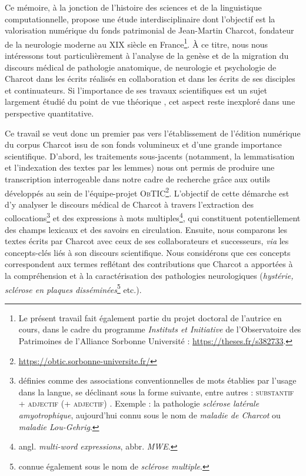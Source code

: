 \label{intro}
Ce mémoire, à la jonction de l'histoire des sciences et de la linguistique computationnelle, propose une étude interdisciplinaire dont l'objectif est la valorisation numérique du fonds patrimonial de Jean-Martin Charcot, fondateur de la neurologie moderne au XIX\ieme{} siècle en France\footnote{Le présent travail fait également partie du projet doctoral de l'autrice en cours, dans le cadre du programme \textit{Instituts et Initiative} de l'Observatoire des Patrimoines de l'Alliance Sorbonne Université : \url{https://theses.fr/s382733}.}. À ce titre, nous nous intéressons tout particulièrement à l'analyse de la genèse et de la migration du discours médical de pathologie anatomique, de neurologie et psychologie de Charcot dans les écrits réalisés en collaboration et dans les écrits de ses disciples et continuateurs. Si l'importance de ses travaux scientifiques est un sujet largement étudié du point de vue théorique \citep{bogousslavsky2011following,broussolle2012,camargo2024}, 
cet aspect reste inexploré dans une perspective quantitative.

Ce travail se veut donc un premier pas vers l'établissement de l'édition numérique du corpus Charcot issu de son fonds volumineux et d'une grande importance scientifique. D'abord, les traitements sous-jacents (notamment, la lemmatisation et l'indexation des textes par les lemmes) nous ont permis de produire une transcription interrogeable dans notre cadre de recherche grâce aux outils développés au sein de l'équipe-projet \textsc{ObTIC}\footnote{\url{https://obtic.sorbonne-universite.fr/}}. L'objectif de cette démarche est d'y analyser le discours médical de Charcot à travers l'extraction des collocations\footnote{définies comme des \og{}associations conventionnelles de mots établies par l'usage dans la langue\fg{}, se déclinant sous la forme suivante, entre autres : \textsc{substantif + adjectif (+ adjectif)} \citep[p. 100]{nerima2006}. Exemple : la pathologie \textit{sclérose latérale amyotrophique}, aujourd'hui connu sous le nom de \textit{maladie de Charcot} ou \textit{maladie Lou-Gehrig}.} et des expressions à mots multiples\footnote{angl. \textit{multi-word expressions}, abbr. \textit{\textsc{MWE}}.}, qui constituent potentiellement des champs lexicaux et des savoirs en circulation. Ensuite, nous comparons les textes écrits par Charcot avec ceux de ses collaborateurs et successeurs, \textit{via} les concepts-clés liés à son discours scientifique. Nous considérons que ces concepts correspondent aux termes reflétant des contributions que Charcot a apportées à la compréhension et à la caractérisation des pathologies neurologiques (\textit{hystérie, sclérose en plaques disséminées}\footnote{connue également sous le nom de \textit{sclérose multiple}.} etc.). 

